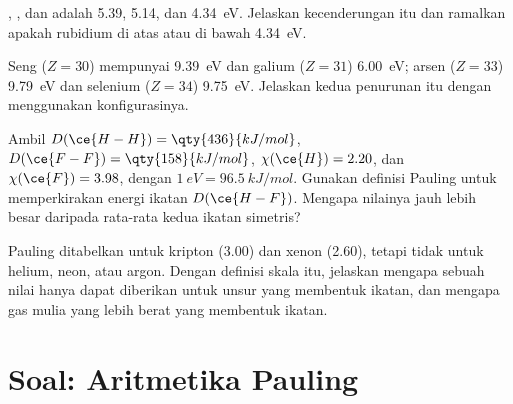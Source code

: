 \begin{exercise}[$\star\star$]\label{exo:b1:periodicity:9}
 , , dan  adalah 5.39, 5.14,
dan \qty{4.34}{eV}. Jelaskan kecenderungan itu dan ramalkan apakah  rubidium di atas atau di bawah \qty{4.34}{eV}.
\end{exercise}

\begin{exercise}[$\star\star\star$]\label{exo:b1:periodicity:10}
Seng ($Z = 30$) mempunyai  \qty{9.39}{eV} dan
galium ($Z = 31$) \qty{6.00}{eV}; arsen ($Z = 33$) \qty{9.79}{eV} dan
selenium ($Z = 34$) \qty{9.75}{eV}. Jelaskan kedua penurunan itu dengan
menggunakan konfigurasinya.
\end{exercise}

\begin{exercise}[$\star\star\star$]\label{exo:b1:periodicity:11}
Ambil $D(\ce{H-H}) = \qty{436}{kJ/mol}$, $D(\ce{F-F}) =
\qty{158}{kJ/mol}$, $\chi(\ce{H}) = 2.20$, dan $\chi(\ce{F}) = 3.98$,
dengan $\qty{1}{eV} = \qty{96.5}{kJ/mol}$. Gunakan definisi Pauling untuk
memperkirakan energi ikatan $D(\ce{H-F})$. Mengapa nilainya jauh lebih
besar daripada rata-rata kedua ikatan simetris?
\end{exercise}

\begin{exercise}[$\star\star\star$]\label{exo:b1:periodicity:12}
 Pauling ditabelkan untuk kripton (3.00) dan xenon
(2.60), tetapi tidak untuk helium, neon, atau argon. Dengan definisi
skala itu, jelaskan mengapa sebuah nilai hanya dapat diberikan untuk
unsur yang membentuk ikatan, dan mengapa gas mulia yang lebih berat yang
membentuk ikatan.
\end{exercise}

\section{Soal: Aritmetika Pauling}

